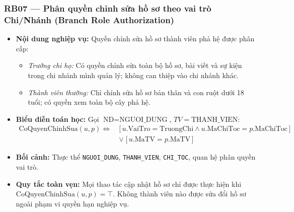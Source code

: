 \subsubsection{RB07 --- Phân quyền chỉnh sửa hồ sơ theo vai trò Chi/Nhánh (Branch Role Authorization)}
\begin{itemize}
    \item \textbf{Nội dung nghiệp vụ:} Quyền chỉnh sửa hồ sơ thành viên phả hệ được phân cấp:
    \begin{itemize}[noitemsep]
        \item \textit{Trưởng chi họ:} Có quyền chỉnh sửa toàn bộ hồ sơ, bài viết và sự kiện trong chi nhánh mình quản lý; không can thiệp vào chi nhánh khác.
        \item \textit{Thành viên thường:} Chỉ chỉnh sửa hồ sơ bản thân và con ruột dưới 18 tuổi; có quyền xem toàn bộ cây phả hệ.
    \end{itemize}
    \item \textbf{Biểu diễn toán học:} Gọi $\text{ND} = \text{NGUOI\_DUNG}$, $TV = \text{THANH\_VIEN}$:
    \begin{equation}
        \begin{aligned}
            \text{CoQuyenChinhSua}(u, p) \iff\ &
            \bigl[\,u.\text{VaiTro} = \text{TruongChi}
            \land u.\text{MaChiToc} = p.\text{MaChiToc}\,\bigr] \\
            &\lor\; \bigl[\,u.\text{MaTV} = p.\text{MaTV}\,\bigr]
        \end{aligned}
    \end{equation}
    \item \textbf{Bối cảnh:} Thực thể \texttt{NGUOI\_DUNG}, \texttt{THANH\_VIEN}, \texttt{CHI\_TOC}, quan hệ phân quyền vai trò.
    \item \textbf{Quy tắc toàn vẹn:} Mọi thao tác cập nhật hồ sơ chỉ được thực hiện khi $\text{CoQuyenChinhSua}(u, p) = \top$. Không thành viên nào được sửa đổi hồ sơ ngoài phạm vi quyền hạn nghiệp vụ.
\end{itemize}

